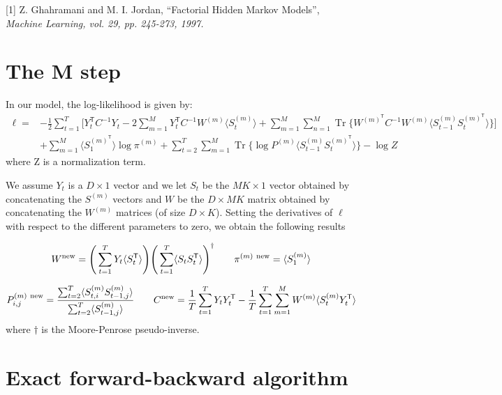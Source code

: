 \documentclass{article}
\DeclareMathOperator{\Tr}{Tr}
\begin{document}
\small

[1] Z. Ghahramani and M. I. Jordan, ``Factorial Hidden Markov Models'', \it{Machine Learning}, vol. 29, pp. 245-273, 1997.

\normalsize

\appendix

\section{The M step}

In our model, the log-likelihood is given by:
\begin{align*}
\ell = &-\frac{1}{2} \sum_{t=1}^T \Bigg[Y_t^\mathsf{T} C^{-1} Y_t - 2 \sum_{m=1}^M Y_t^\mathsf{T} C^{-1} W^{(m)} \langle S_t^{(m)} \rangle + \sum_{m=1}^M \sum_{n=1}^M \Tr\bigg\{ W^{(m)^\mathsf{T}} C^{-1} W^{(m)} \langle S_{t-1}^{(m)} S_{t}^{(m)^\mathsf{T}} \rangle \bigg\} \Bigg] \\
&+ \sum_{m=1}^M \langle S_1^{(m)^\mathsf{T}} \rangle \log \pi^{(m)} + \sum_{t=2}^T \sum_{m=1}^M \Tr\Big\{ \log P^{(m)} \langle S_{t-1}^{(m)} S_{t}^{(m)^\mathsf{T}} \rangle \Big\} - \log Z
\end{align*} 
where Z is a normalization term.

We assume $Y_t$ is a $D \times 1$ vector and we let $S_t$ be the $MK \times 1$ vector obtained by concatenating the $S^{(m)}$ vectors and $W$ be the $D \times MK$ matrix obtained by concatenating the $W^{(m)}$ matrices (of size $D \times K$). Setting the derivatives of $\ell$ with respect to the different parameters to zero, we obtain the following results

\[ W^\textnormal{new} = \Bigg( \sum_{t=1}^T Y_t \langle S_{t}^\mathsf{T} \rangle \Bigg) \Bigg( \sum_{t=1}^T \langle S_{t} S_{t}^\mathsf{T} \rangle \Bigg)^\dagger \qquad \pi^{(m) \ \textnormal{new}} = \langle S_{1}^{(m)}  \rangle\]

\[ P_{i,j}^{(m) \ \textnormal{new}} = \frac{\sum_{t=2}^T \langle S_{t,i}^{(m)} S_{t-1,j}^{(m)}  \rangle}{\sum_{t=2}^T \langle S_{t-1,j}^{(m)}  \rangle} \qquad C^{\textnormal{new}} = \frac{1}{T} \sum_{t=1}^T Y_t Y_t^\mathsf{T} - \frac{1}{T} \sum_{t=1}^T \sum_{m=1}^M W^{(m)} \langle S_t^{(m)} Y_t^\mathsf{T} \rangle \]
where $\dagger$ is the Moore-Penrose pseudo-inverse.

\section{Exact forward-backward algorithm}
\end{document}
